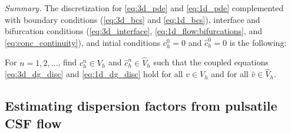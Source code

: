 \documentclass[fleqn,10pt]{wlscirep}
\begin{document}
 \textit{Summary.} The discretization for \eqref{eq:3d_pde} and \eqref{eq:1d_pde} complemented with boundary conditions (\eqref{eq:3d_bcs} and \eqref{eq:1d_bcs}), interface and bifurcation  conditions (\eqref{eq:3d_interface}, \eqref{eq:1d_flow:bifurcations}, and \eqref{eq:conc_continuity}), and intial conditions $c_h^0 =0 $ and $\hat c_h^0 = 0 $ is the following: 

 For $n = 1,2, \ldots $, find  $c_h^n \in V_h$ and $\hat c^n_h \in \hat V_h$ such that the coupled equations \eqref{eq:3d_dg_disc} and \eqref{eq:1d_dg_disc} hold for all $v \in V_h$ and for all $\hat v \in \hat V_h$. 



\subsection{Estimating dispersion factors from pulsatile CSF flow}
\label{sec:app:dispersion}
\end{document}
